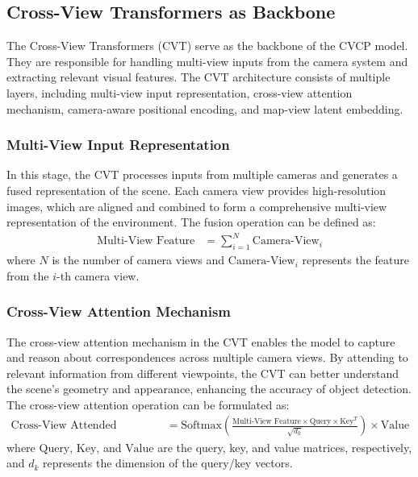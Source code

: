 \documentclass[times, report, parskip, openbib, twocolumn]{article}
\begin{document}
\subsection{Cross-View Transformers as Backbone}
\label{subsec:cross_view_transformers}

The Cross-View Transformers (CVT) serve as the backbone of the CVCP model. They are responsible for handling multi-view inputs from the camera system and extracting relevant visual features. The CVT architecture consists of multiple layers, including multi-view input representation, cross-view attention mechanism, camera-aware positional encoding, and map-view latent embedding.

\subsubsection{Multi-View Input Representation}
\label{subsubsec:multi_view_representation}

In this stage, the CVT processes inputs from multiple cameras and generates a fused representation of the scene. Each camera view provides high-resolution images, which are aligned and combined to form a comprehensive multi-view representation of the environment. The fusion operation can be defined as:
\begin{align}
    \text{Multi-View Feature} &= \sum_{i=1}^{N} \text{Camera-View}_i
\end{align}
where $N$ is the number of camera views and $\text{Camera-View}_i$ represents the feature from the $i$-th camera view.

\subsubsection{Cross-View Attention Mechanism}
\label{subsubsec:cross_view_attention}

The cross-view attention mechanism in the CVT enables the model to capture and reason about correspondences across multiple camera views. By attending to relevant information from different viewpoints, the CVT can better understand the scene's geometry and appearance, enhancing the accuracy of object detection. The cross-view attention operation can be formulated as:
\begin{align}
    \text{Cross-View Attended Feature} &= \text{Softmax}\left(\frac{\text{Multi-View Feature} \times \text{Query} \times \text{Key}^T}{\sqrt{d_k}}\right) \times \text{Value}
\end{align}
where $\text{Query}$, $\text{Key}$, and $\text{Value}$ are the query, key, and value matrices, respectively, and $d_k$ represents the dimension of the query/key vectors.
\end{document}
